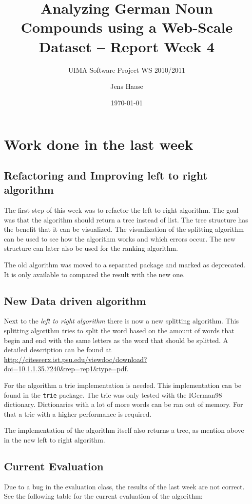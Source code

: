 \documentclass[11pt, accentcolor=tud9b, nochapname]{tudexercise}
\begin{document}
\author{Jens Haase}
\title{Analyzing German Noun Compounds using a
  Web-Scale Dataset -- Report Week 4}
\subtitle{UIMA Software Project WS 2010/2011}
\date{\today}
\maketitle

\section{Work done in the last week}

\subsection{Refactoring and Improving left to right algorithm}
The first step of this week was to refactor the left to right algorithm. The goal was that the algorithm should return a tree instead of list. The tree structure has the benefit that it can be visualized. The visualization of the splitting algorithm can be used to see how the algorithm works and which errors occur. The new structure can later also be used for the ranking algorithm.

The old algorithm was moved to a separated package and marked as deprecated. It is only available to compared the result with the new one.

\subsection{New Data driven algorithm}
Next to the \emph{left to right algorithm} there is now a new splitting algorithm. This splitting algorithm tries to split the word based on the amount of words that begin and end with the same letters as the word that should be splitted. A detailed description can be found at \url{http://citeseerx.ist.psu.edu/viewdoc/download?doi=10.1.1.35.7240&rep=rep1&type=pdf}.

For the algorithm a trie implementation is needed. This implementation can be found in the \texttt{trie} package. The trie was only tested with the IGerman98 dictionary. Dictionaries with a lot of more words can be ran out of memory. For that a trie with a higher performance is required.

The implementation of the algorithm itself also returns a tree, as mention above in the new left to right algorithm.

\subsection{Current Evaluation}
Due to a bug in the evaluation class, the results of the last week are not correct. See the following table for the current evaluation of the algorithm:
\end{document}
